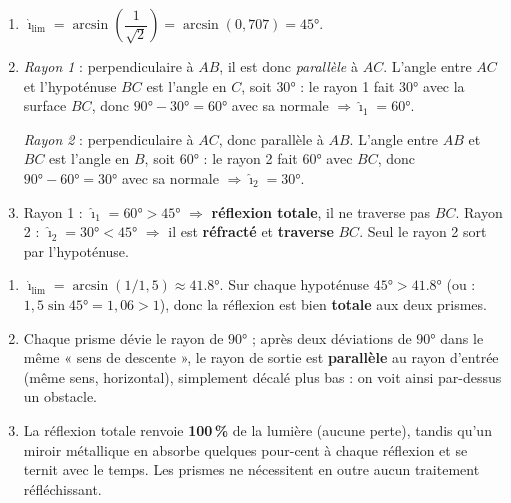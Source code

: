 \documentclass[11pt,a4paper]{article}
\begin{document}
\begin{corrige}
\begin{enumerate}[label=\alph*)]
  \item $\hat{\imath}_{\text{lim}}=\arcsin\!\left(\dfrac{1}{\sqrt2}\right)=\arcsin(0{,}707)=\ang{45}$.
  \item \emph{Rayon 1} : perpendiculaire à $AB$, il est donc \emph{parallèle} à $AC$. L'angle entre
        $AC$ et l'hypoténuse $BC$ est l'angle en $C$, soit $\ang{30}$ : le rayon 1 fait $\ang{30}$ avec
        la surface $BC$, donc $\ang{90}-\ang{30}=\ang{60}$ avec sa normale $\Rightarrow \hat{\imath}_1=\ang{60}$.

        \emph{Rayon 2} : perpendiculaire à $AC$, donc parallèle à $AB$. L'angle entre $AB$ et $BC$ est
        l'angle en $B$, soit $\ang{60}$ : le rayon 2 fait $\ang{60}$ avec $BC$, donc
        $\ang{90}-\ang{60}=\ang{30}$ avec sa normale $\Rightarrow \hat{\imath}_2=\ang{30}$.
  \item Rayon 1 : $\hat{\imath}_1=\ang{60}>\ang{45}$ $\Rightarrow$ \textbf{réflexion totale}, il ne
        traverse pas $BC$. Rayon 2 : $\hat{\imath}_2=\ang{30}<\ang{45}$ $\Rightarrow$ il est
        \textbf{réfracté} et \textbf{traverse} $BC$. Seul le rayon 2 sort par l'hypoténuse.
\end{enumerate}
\end{corrige}

\begin{corrige}
\begin{enumerate}[label=\alph*)]
  \item $\hat{\imath}_{\text{lim}}=\arcsin(1/1{,}5)\approx\ang{41.8}$. Sur chaque hypoténuse
        $\ang{45}>\ang{41.8}$ (ou : $1{,}5\sin\ang{45}=1{,}06>1$), donc la réflexion est bien
        \textbf{totale} aux deux prismes.
  \item Chaque prisme dévie le rayon de $\ang{90}$ ; après deux déviations de $\ang{90}$ dans le même
        « sens de descente », le rayon de sortie est \textbf{parallèle} au rayon d'entrée (même sens,
        horizontal), simplement décalé plus bas : on voit ainsi par-dessus un obstacle.
  \item La réflexion totale renvoie \textbf{100\,\%} de la lumière (aucune perte), tandis qu'un miroir
        métallique en absorbe quelques pour-cent à chaque réflexion et se ternit avec le temps. Les
        prismes ne nécessitent en outre aucun traitement réfléchissant.
\end{enumerate}
\end{corrige}
\end{document}

